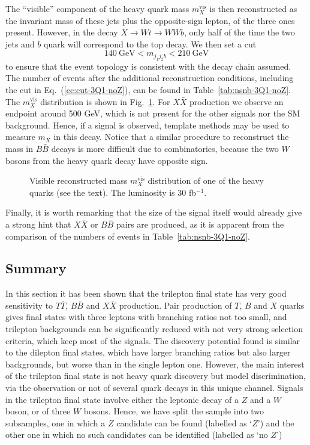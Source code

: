\documentclass[12pt,a4paper]{article}
\newcommand{\fbin}{fb$^{-1}$}
\newcommand{\TT}{T \bar T}
\newcommand{\BB}{B \bar B}
\newcommand{\XX}{X \bar X}
\begin{document}
The ``visible'' component of the heavy quark mass $m_X^\text{vis}$ is then reconstructed as the invariant mass of these jets plus the opposite-sign lepton, of the three ones present. However,
in the decay $X \to W t \to WWb$, only half of the time the two jets and $b$ quark will correspond to the top decay. We then set a cut
\begin{equation}
140~\text{GeV} < m_{j_1 j_2 b} < 210~\text{GeV}
\label{ec:cut-3Q1-noZ}
\end{equation}
to ensure that the event topology is consistent with the decay chain assumed. The number of events after the additional reconstruction conditions, including the cut in Eq.~(\ref{ec:cut-3Q1-noZ}), can be found in Table~\ref{tab:nsnb-3Q1-noZ}.
The $m_X^\text{vis}$ distribution is shown in Fig.~\ref{fig:mrec-3Q1-noZ}. For $\XX$ production we observe an endpoint around 500 GeV, which is not present for the other signals nor the SM background. Hence, if a signal is observed, template methods may be used to measure $m_X$ in this decay. Notice that a similar procedure to reconstruct the mass in $\BB$ decays is more difficult due to combinatorics, because the two $W$ bosons from the heavy quark decay have opposite sign.
%
\begin{figure}[t]
\begin{center}
\caption{Visible reconstructed mass $m_X^\text{vis}$ distribution of one of the heavy quarks (see the text). The luminosity is 30 \fbin.}
\label{fig:mrec-3Q1-noZ}
\end{center}
\end{figure}
%
Finally, it is worth remarking that the size of the signal itself would already give a strong hint that $\XX$ or $\BB$ pairs are produced, as it is apparent from the comparison of the numbers of events in Table~\ref{tab:nsnb-3Q1-noZ}.


\subsection{Summary}

In this section it has been shown that the trilepton final state has very good sensitivity to $\TT$, $\BB$ and $\XX$ production. Pair production of $T$, $B$ and $X$ quarks
gives final states with three leptons with branching ratios not too small, and trilepton backgrounds can be significantly reduced with not very strong selection criteria, which keep most of the signals. The discovery potential found is similar to the dilepton final states, which have larger branching ratios but also larger backgrounds, but worse than in the single lepton one. However, the main interest of the trilepton final state is not heavy quark discovery but model discrimination, via the observation or not of several quark decays in this unique channel.
Signals in the trilepton final state involve either the leptonic decay of a $Z$ and a $W$ boson, or of three $W$ bosons. Hence, we have split the sample into two subsamples, one in which a $Z$ candidate can be found (labelled as `$Z$') and the other one in which no such candidates can be identified (labelled as `no $Z$')
\end{document}
